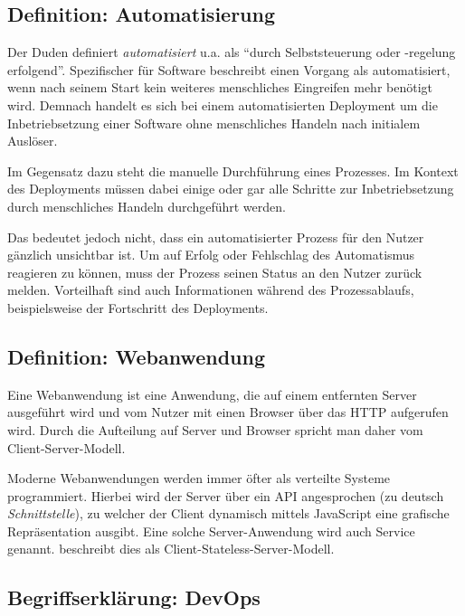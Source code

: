 \subsection{Definition: Automatisierung}

Der Duden \citeyearpar{Duden} definiert \emph{automatisiert} u.a. als ``durch Selbststeuerung oder -regelung erfolgend''. Spezifischer für Software beschreibt \citet[27]{Duvall2007} einen Vorgang als automatisiert, wenn nach seinem Start kein weiteres menschliches Eingreifen mehr benötigt wird. Demnach handelt es sich bei einem automatisierten Deployment um die Inbetriebsetzung einer Software ohne menschliches Handeln nach initialem Auslöser.

Im Gegensatz dazu steht die manuelle Durchführung eines Prozesses. Im Kontext des Deployments müssen dabei einige oder gar alle Schritte zur Inbetriebsetzung durch menschliches Handeln durchgeführt werden.

Das bedeutet jedoch nicht, dass ein automatisierter Prozess für den Nutzer gänzlich unsichtbar ist. Um auf Erfolg oder Fehlschlag des Automatismus reagieren zu können, muss der Prozess seinen Status an den Nutzer zurück melden. Vorteilhaft sind auch Informationen während des Prozessablaufs, beispielsweise der Fortschritt des Deployments. \citep[10f]{Duvall2007}

\subsection{Definition: Webanwendung}

Eine Webanwendung ist eine Anwendung, die auf einem entfernten Server ausgeführt wird und vom Nutzer mit einen Browser über das \ac{HTTP} aufgerufen wird. Durch die Aufteilung auf Server und Browser spricht man daher vom Client-Server-Modell. \citep{wiki:webanwendung}

Moderne Webanwendungen werden immer öfter als verteilte Systeme programmiert. Hierbei wird der Server über ein \ac{API} angesprochen (zu deutsch \emph{Schnittstelle}), zu welcher der Client dynamisch mittels JavaScript eine grafische Repräsentation ausgibt. Eine solche Server-Anwendung wird auch Service genannt. \citet[Kapitel 5.1.3]{Fielding} beschreibt dies als Client-Stateless-Server-Modell.

\subsection{Begriffserklärung: DevOps}
\label{subsec:devops}


